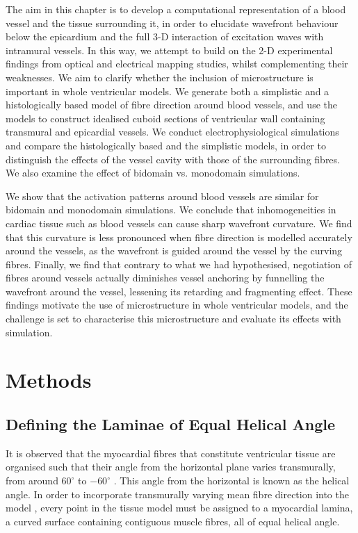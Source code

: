  The aim in this chapter is to develop a computational representation of a blood vessel and the tissue surrounding it, in order to elucidate wavefront behaviour below the epicardium and the full 3-D interaction of excitation waves with intramural vessels. In this way, we attempt to build on the 2-D experimental findings from optical and electrical mapping studies, whilst complementing their weaknesses. We aim to clarify whether the inclusion of microstructure is important in whole ventricular models. We generate both a simplistic and a histologically based model of fibre direction around blood vessels, and use the models to construct idealised cuboid sections of ventricular wall containing transmural and epicardial vessels. We conduct electrophysiological simulations and compare the histologically based and the simplistic models, in order to distinguish the effects of the vessel cavity with those of the surrounding fibres. We also examine the effect of bidomain vs. monodomain simulations.

  We show that the activation patterns around blood vessels are similar for bidomain and monodomain simulations. We conclude that inhomogeneities in cardiac tissue such as blood vessels can cause sharp wavefront curvature. We find that this curvature is less pronounced when fibre direction is modelled accurately around the vessels, as the wavefront is guided around the vessel by the curving fibres. Finally, we find that contrary to what we had hypothesised, negotiation of fibres around vessels actually diminishes vessel anchoring by funnelling the wavefront around the vessel, lessening its retarding and fragmenting effect. These findings motivate the use of microstructure in whole ventricular models, and the challenge is set to characterise this microstructure and evaluate its effects with simulation.

\section{Methods} %
\label{sec:methods}
\subsection{Defining the Laminae of Equal Helical Angle} %
\label{sec:defining_the_laminae_of_equal_helical_angle}
  It is observed that the myocardial fibres that constitute ventricular tissue are organised such that their angle from the horizontal plane varies transmurally, from around $60^\circ$ to $-60^\circ$ \cite{StreeterJr1969}. This angle from the horizontal is known as the helical angle. In order to incorporate transmurally varying mean fibre direction into the model \cite{Potse2006}, every point in the tissue model must be assigned to a myocardial lamina, a curved surface containing contiguous muscle fibres, all of equal helical angle.
  
